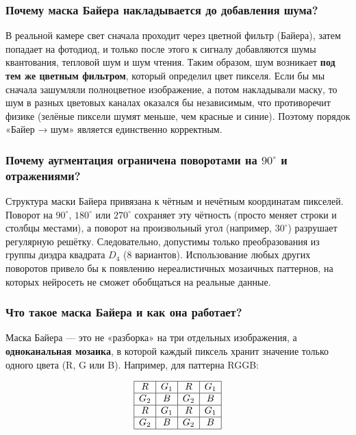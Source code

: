 \documentclass[12pt,a4paper]{article}
\begin{document}
\subsubsection{Почему маска Байера накладывается до добавления шума?}

В реальной камере свет сначала проходит через цветной фильтр (Байера), затем попадает на фотодиод, и только после этого к сигналу добавляются шумы квантования, тепловой шум и шум чтения. Таким образом, шум возникает \textbf{под тем же цветным фильтром}, который определил цвет пикселя. Если бы мы сначала зашумляли полноцветное изображение, а потом накладывали маску, то шум в разных цветовых каналах оказался бы независимым, что противоречит физике (зелёные пиксели шумят меньше, чем красные и синие). Поэтому порядок «Байер → шум» является единственно корректным.

\subsubsection{Почему аугментация ограничена поворотами на $90^\circ$ и отражениями?}

Структура маски Байера привязана к чётным и нечётным координатам пикселей. Поворот на $90^\circ$, $180^\circ$ или $270^\circ$ сохраняет эту чётность (просто меняет строки и столбцы местами), а поворот на произвольный угол (например, $30^\circ$) разрушает регулярную решётку. Следовательно, допустимы только преобразования из группы диэдра квадрата $D_4$ (8 вариантов). Использование любых других поворотов привело бы к появлению нереалистичных мозаичных паттернов, на которых нейросеть не сможет обобщаться на реальные данные.

\subsubsection{Что такое маска Байера и как она работает?}

Маска Байера — это не «разборка» на три отдельных изображения, а \textbf{одноканальная мозаика}, в которой каждый пиксель хранит значение только одного цвета (R, G или B). Например, для паттерна RGGB:

\[
\begin{array}{|c|c|c|c|}
\hline
R & G_1 & R & G_1 \\
\hline
G_2 & B & G_2 & B \\
\hline
R & G_1 & R & G_1 \\
\hline
G_2 & B & G_2 & B \\
\hline
\end{array}
\]
\end{document}
